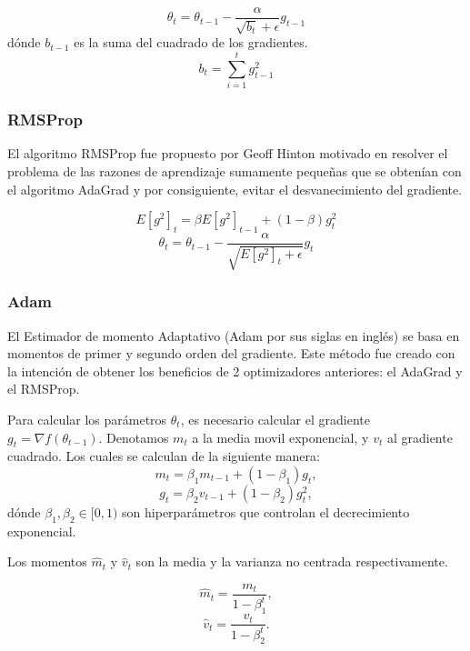 \begin{equation}
    \theta_t = \theta_{t-1} - \frac{\alpha}{\sqrt{b_t} + \epsilon} g_{t-1}
\end{equation}
dónde $b_{t-1}$ es la suma del cuadrado de los gradientes.
\begin{equation}
    b_t = \sum_{i=1}^tg_{t-1}^2
\end{equation}

\subsubsection{RMSProp}
El algoritmo RMSProp fue propuesto por Geoff Hinton motivado en resolver el problema de las razones de aprendizaje sumamente pequeñas que se obtenían con el algoritmo AdaGrad y por consiguiente, evitar el desvanecimiento del gradiente.

\begin{equation}
    E[g^2]_t = \beta E[g^2]_{t-1} + (1-\beta)g_t^2
\end{equation}
\begin{equation}
    \theta_t = \theta_{t-1} - \frac{\alpha}{\sqrt{E[g^2]_t + \epsilon}}g_t
\end{equation}
\subsubsection{Adam}
El Estimador de momento Adaptativo (Adam por sus siglas en inglés) \cite{adam} se basa en momentos de primer y segundo orden del gradiente. Este método fue creado con la intención de obtener los beneficios de 2 optimizadores anteriores: el AdaGrad y el RMSProp. 


Para calcular los parámetros $\theta_t$, es necesario calcular el gradiente $g_t= \nabla f(\theta_{t-1})$. Denotamos  $m_t$ a la media movil exponencial, y $v_t$ al gradiente cuadrado. Los cuales se calculan de la siguiente manera:
\begin{equation}
    m_t = \beta_1 m_{t-1} + (1-\beta_1)g_t,
\end{equation}
\begin{equation}
    g_t = \beta_2 v_{t-1} + (1-\beta_2)g_t^2,
\end{equation}
dónde $\beta_1, \beta_2\in [0,1)$ son hiperparámetros que controlan el decrecimiento exponencial.

Los momentos $\hat m_t$ y $\hat v_t$ son la media y la varianza no centrada respectivamente.

\begin{equation}
    \hat m_t = \frac{m_t }{1-\beta_1^t},
\end{equation}
\begin{equation}
    \hat v_t = \frac{v_t}{1-\beta_2^t}.
\end{equation}

